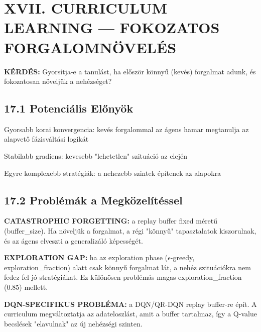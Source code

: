 \documentclass[11pt,a4paper]{article}
\begin{document}
\section*{XVII. CURRICULUM LEARNING — FOKOZATOS FORGALOMNÖVELÉS}

\textbf{KÉRDÉS:} Gyorsítja-e a tanulást, ha először könnyű (kevés) forgalmat
adunk, és fokozatosan növeljük a nehézséget?

\subsection*{17.1 Potenciális Előnyök}
\par\noindent\hspace*{1em}\textbullet{} Gyorsabb korai konvergencia: kevés forgalommal az ágens hamar megtanulja
az alapvető fázisváltási logikát
\par\noindent\hspace*{1em}\textbullet{} Stabilabb gradiens: kevesebb "lehetetlen" szituáció az elején
\par\noindent\hspace*{1em}\textbullet{} Egyre komplexebb stratégiák: a nehezebb szintek építenek az alapokra

\subsection*{17.2 Problémák a Megközelítéssel}
\par\noindent\hspace*{1em}\textbullet{} \textbf{CATASTROPHIC FORGETTING:} a replay buffer fixed méretű (buffer\_size).
Ha növeljük a forgalmat, a régi "könnyű" tapasztalatok kiszorulnak,
és az ágens elveszti a generalizáló képességét.
\par\noindent\hspace*{1em}\textbullet{} \textbf{EXPLORATION GAP:} ha az exploration phase ($\epsilon$-greedy, exploration\_fraction)
alatt csak könnyű forgalmat lát, a nehéz szituációkra nem fedez fel
jó stratégiákat. Ez különösen problémás magas exploration\_fraction (0.85)
mellett.
\par\noindent\hspace*{1em}\textbullet{} \textbf{DQN-SPECIFIKUS PROBLÉMA:} a DQN/QR-DQN replay buffer-re épít.
A curriculum megváltoztatja az adateloszlást, amit a buffer tartalmaz,
így a Q-value becslések "elavulnak" az új nehézségi szinten.
\end{document}
